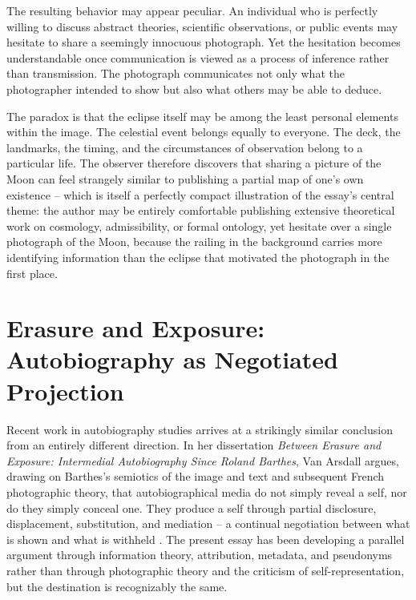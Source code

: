 \documentclass[11pt]{article}
\theoremstyle{plain}
\begin{document}
The resulting behavior may appear peculiar. An individual who is perfectly willing to discuss abstract theories, scientific observations, or public events may hesitate to share a seemingly innocuous photograph. Yet the hesitation becomes understandable once communication is viewed as a process of inference rather than transmission. The photograph communicates not only what the photographer intended to show but also what others may be able to deduce.

The paradox is that the eclipse itself may be among the least personal elements within the image. The celestial event belongs equally to everyone. The deck, the landmarks, the timing, and the circumstances of observation belong to a particular life. The observer therefore discovers that sharing a picture of the Moon can feel strangely similar to publishing a partial map of one's own existence -- which is itself a perfectly compact illustration of the essay's central theme: the author may be entirely comfortable publishing extensive theoretical work on cosmology, admissibility, or formal ontology, yet hesitate over a single photograph of the Moon, because the railing in the background carries more identifying information than the eclipse that motivated the photograph in the first place.

\section{Erasure and Exposure: Autobiography as Negotiated Projection}

Recent work in autobiography studies arrives at a strikingly similar conclusion from an entirely different direction. In her dissertation \emph{Between Erasure and Exposure: Intermedial Autobiography Since Roland Barthes}, Van Arsdall argues, drawing on Barthes's semiotics of the image and text \cite{barthes1977,barthes1981} and subsequent French photographic theory, that autobiographical media do not simply reveal a self, nor do they simply conceal one. They produce a self through partial disclosure, displacement, substitution, and mediation -- a continual negotiation between what is shown and what is withheld \cite{vanarsdall2015}. The present essay has been developing a parallel argument through information theory, attribution, metadata, and pseudonyms rather than through photographic theory and the criticism of self-representation, but the destination is recognizably the same.
\end{document}
